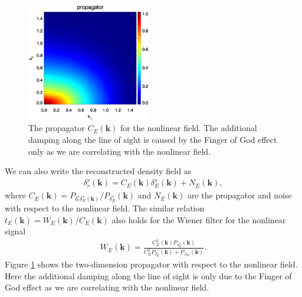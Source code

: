 \documentclass[aps,prd,twocolumn,superscriptaddress,groupedaddress,nofootinbib,amsfont]{revtex4}  %
\newcommand{\bea}{\begin{eqnarray}}
\newcommand{\eea}{\end{eqnarray}}
\newcommand{\bmk}{\bm{k}}
\begin{document}
\begin{figure}[tbp]
\begin{center}
\includegraphics[width=0.48\textwidth]{0.000transf-the_deltaRsxEs_4x.eps}
\end{center}
\vspace{-0.7cm}
\caption{The propagator $C_E(\bmk)$ for the nonlinear field. The additional 
damping along the line of sight is caused by the Finger of God effect only as 
we are correlating with the nonlinear field.}
\label{fig:tf_Es}
\end{figure}

We can also write the reconstructed density field as 
\bea
\delta_r^s(\bmk)=C_E(\bmk)\delta_E^s(\bmk)+N_E(\bmk),
\eea
where $C_E(\bmk)=P_{\delta_r^s\delta_E^s(\bmk)}/P_{\delta_E^s}(\bmk)$ and 
$N_E(\bmk)$ are the propagator and noise with respect to the nonlinear field.
The similar relation $t_E(\bmk)={W_E(\bmk)}/{C_E(\bmk)}$ also holds for the 
Wiener filter for the nonlinear signal 
\bea
W_E(\bmk)=\frac{C^2_E(\bmk)P_{\delta_E^s}(\bmk)}{C_E^2P_{\delta^s_E}(\bmk)+P_{N_E}(\bmk)}.
\eea
Figure \ref{fig:tf_Es} shows the two-dimension propagator with respect to the
nonlinear field. Here the additional damping along the line of sight is only
due to the Finger of God effect as we are correlating with the nonlinear field.
\end{document}

